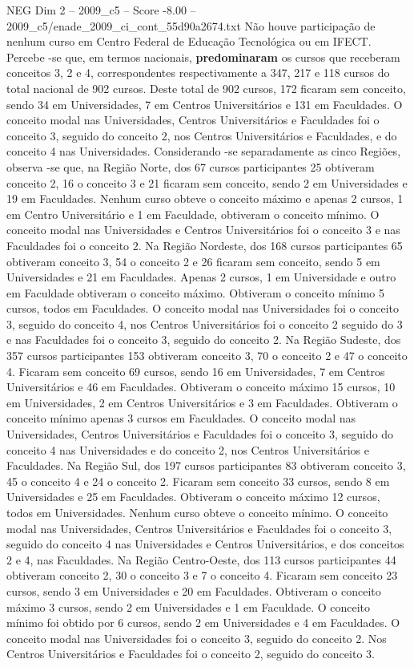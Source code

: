 \begin{textsample}{NEG Dim 2 – 2009\_c5 – Score -8.00 – 2009\_c5/enade\_2009\_ci\_cont\_55d90a2674.txt}
Não houve participação de nenhum curso em Centro Federal de Educação Tecnológica ou em IFECT.
Percebe -se que, em termos nacionais, \textbf{predominaram} os cursos que receberam conceitos 3, 2 e 4, correspondentes respectivamente a 347, 217 e 118 cursos do total nacional de 902 cursos.
Deste total de 902 cursos, 172 ficaram sem conceito, sendo 34 em Universidades, 7 em Centros Universitários e 131 em Faculdades.
O conceito modal nas Universidades, Centros Universitários e Faculdades foi o conceito 3, seguido do conceito 2, nos Centros Universitários e Faculdades, e do conceito 4 nas Universidades.
Considerando -se separadamente as cinco Regiões, observa -se que, na Região Norte, dos 67 cursos participantes 25 obtiveram conceito 2, 16 o conceito 3 e 21 ficaram sem conceito, sendo 2 em Universidades e 19 em Faculdades.
Nenhum curso obteve o conceito máximo e apenas 2 cursos, 1 em Centro Universitário e 1 em Faculdade, obtiveram o conceito mínimo.
O conceito modal nas Universidades e Centros Universitários foi o conceito 3 e nas Faculdades foi o conceito 2.
Na Região Nordeste, dos 168 cursos participantes 65 obtiveram conceito 3, 54 o conceito 2 e 26 ficaram sem conceito, sendo 5 em Universidades e 21 em Faculdades.
Apenas 2 cursos, 1 em Universidade e outro em Faculdade obtiveram o conceito máximo.
Obtiveram o conceito mínimo 5 cursos, todos em Faculdades.
O conceito modal nas Universidades foi o conceito 3, seguido do conceito 4, nos Centros Universitários foi o conceito 2 seguido do 3 e nas Faculdades foi o conceito 3, seguido do conceito 2.
Na Região Sudeste, dos 357 cursos participantes 153 obtiveram conceito 3, 70 o conceito 2 e 47 o conceito 4.
Ficaram sem conceito 69 cursos, sendo 16 em Universidades, 7 em Centros Universitários e 46 em Faculdades.
Obtiveram o conceito máximo 15 cursos, 10 em Universidades, 2 em Centros Universitários e 3 em Faculdades.
Obtiveram o conceito mínimo apenas 3 cursos em Faculdades.
O conceito modal nas Universidades, Centros Universitários e Faculdades foi o conceito 3, seguido do conceito 4 nas Universidades e do conceito 2, nos Centros Universitários e Faculdades.
Na Região Sul, dos 197 cursos participantes 83 obtiveram conceito 3, 45 o conceito 4 e 24 o conceito 2.
Ficaram sem conceito 33 cursos, sendo 8 em Universidades e 25 em Faculdades.
Obtiveram o conceito máximo 12 cursos, todos em Universidades.
Nenhum curso obteve o conceito mínimo.
O conceito modal nas Universidades, Centros Universitários e Faculdades foi o conceito 3, seguido do conceito 4 nas Universidades e Centros Universitários, e dos conceitos 2 e 4, nas Faculdades.
Na Região Centro-Oeste, dos 113 cursos participantes 44 obtiveram conceito 2, 30 o conceito 3 e 7 o conceito 4.
Ficaram sem conceito 23 cursos, sendo 3 em Universidades e 20 em Faculdades.
Obtiveram o conceito máximo 3 cursos, sendo 2 em Universidades e 1 em Faculdade.
O conceito mínimo foi obtido por 6 cursos, sendo 2 em Universidades e 4 em Faculdades.
O conceito modal nas Universidades foi o conceito 3, seguido do conceito 2.
Nos Centros Universitários e Faculdades foi o conceito 2, seguido do conceito 3.

\end{textsample}
